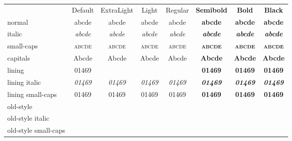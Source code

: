 \documentclass[12pt]{standalone}
\newcommand*\spA{abcde}
\newcommand*\spB{01469}
\newcommand*\spr[1][\spA]{& #1 & #1 & #1 & #1 & #1 & #1 & #1\\}
\begin{document}
\begin{tabular}{
		>{\sourceserifpro}l
		>{}c
		>{\sourceserifproextreme}c
		>{\sourceserifprolight}c
		>{\sourceserifpro}c
		>{\sourceserifprolight\bfseries}c
		>{\sourceserifpro\bfseries}c
		>{\sourceserifproextreme\bfseries}c }
	& Default & ExtraLight & Light & Regular & Semibold & Bold & Black \\
	normal               \spr
	italic               \spr[\itshape\spA]
	small-caps           \spr[\scshape\spA]
	capitals             \spr[\MakeUppercase\spA]
	lining               \spr[\spB]
	lining italic        \spr[\itshape\spB]
	lining small-caps    \spr[\scshape\spB]
	old-style            \spr[\oldstylenums{\spB}]
	old-style italic     \spr[\oldstylenums{\itshape \spB}]
	old-style small-caps \spr[\oldstylenums{\scshape\spB}]
\end{tabular}
\end{document}
